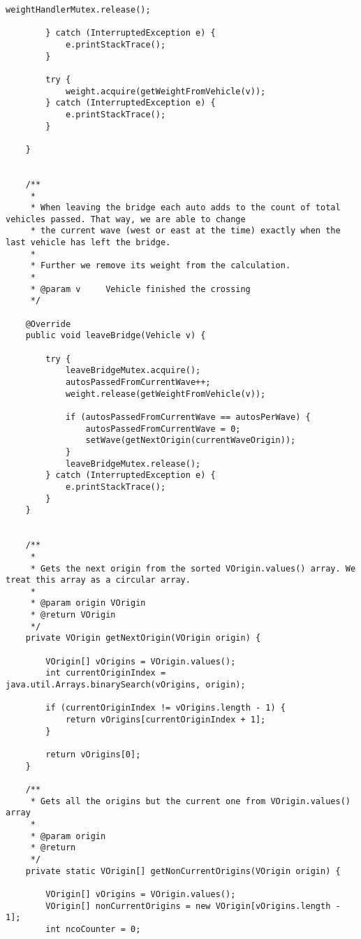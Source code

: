\begin{itemize}
\begin{lstlisting}[style=java]
            weightHandlerMutex.release();

        } catch (InterruptedException e) {
            e.printStackTrace();
        }

        try {
            weight.acquire(getWeightFromVehicle(v));
        } catch (InterruptedException e) {
            e.printStackTrace();
        }

    }


    /**
     *
     * When leaving the bridge each auto adds to the count of total vehicles passed. That way, we are able to change
     * the current wave (west or east at the time) exactly when the last vehicle has left the bridge.
     *
     * Further we remove its weight from the calculation.
     *
     * @param v		Vehicle finished the crossing
     */

    @Override
    public void leaveBridge(Vehicle v) {

        try {
            leaveBridgeMutex.acquire();
            autosPassedFromCurrentWave++;
            weight.release(getWeightFromVehicle(v));

            if (autosPassedFromCurrentWave == autosPerWave) {
                autosPassedFromCurrentWave = 0;
                setWave(getNextOrigin(currentWaveOrigin));
            }
            leaveBridgeMutex.release();
        } catch (InterruptedException e) {
            e.printStackTrace();
        }
    }


    /**
     *
     * Gets the next origin from the sorted VOrigin.values() array. We treat this array as a circular array.
     *
     * @param origin VOrigin
     * @return VOrigin
     */
    private VOrigin getNextOrigin(VOrigin origin) {

        VOrigin[] vOrigins = VOrigin.values();
        int currentOriginIndex = java.util.Arrays.binarySearch(vOrigins, origin);

        if (currentOriginIndex != vOrigins.length - 1) {
            return vOrigins[currentOriginIndex + 1];
        }

        return vOrigins[0];
    }

    /**
     * Gets all the origins but the current one from VOrigin.values() array
     *
     * @param origin
     * @return
     */
    private static VOrigin[] getNonCurrentOrigins(VOrigin origin) {

        VOrigin[] vOrigins = VOrigin.values();
        VOrigin[] nonCurrentOrigins = new VOrigin[vOrigins.length - 1];
        int ncoCounter = 0;


\end{lstlisting}
\end{itemize}

